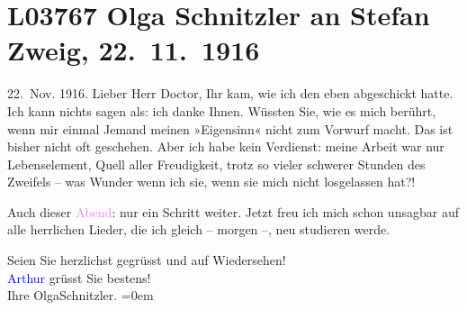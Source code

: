 

\section[Olga Schnitzler an Stefan Zweig, 22. 11. 1916]{L03767 Olga Schnitzler an Stefan Zweig, 22. 11. 1916}
\nopagebreak{}
\rehead{ }\normalsize\beginnumbering{}
\toendnotes[C]{\smallbreak\pagebreak[2]}
\toendnotes[C]{\smallbreak}
\pstart
           \raggedleft{}{\pb}22. Nov. 1916. \pend
           \vspace{0.5em}
\pstart
           Lieber Herr Doctor, Ihr \label{K_L03767-1v}\label{K_L03767-1} kam, wie ich den \label{K_L03767-2v}\label{K_L03767-2} eben
               abgeschickt hatte. Ich kann nichts sagen als: ich danke Ihnen. Wüssten Sie, wie es
               mich berührt, wenn mir einmal Jemand meinen »Eigensinn« nicht zum Vorwurf macht. Das
               ist bisher nicht oft geschehen. Aber ich habe {\pb}kein
               Verdienst: meine Arbeit war nur Lebenselement, Quell aller Freudigkeit, trotz so
               vieler schwerer Stunden des Zweifels – was Wunder wenn ich sie, wenn sie mich nicht
               losgelassen hat?!\pend
           
\pstart
           Auch dieser \textcolor{violet}{Abend}\ledrightnote{{$\rightarrow$}\emph{\textcolor{violet}{Gesangskonzert von Olga Schnitzler, 18.11.1916}}}: nur ein Schritt weiter. Jetzt freu ich mich schon unsagbar auf
               alle herrlichen Lieder, die ich gleich – morgen –, neu studieren werde.\pend
           
\pstart
           Seien Sie herzlichst gegrüsst und auf Wiedersehen!{\\[\baselineskip]}\textcolor{blue}{Arthur}{}\ledrightnote{} grüsst Sie bestens!{\\[\baselineskip]}Ihre
                  \spacefill\mbox{OlgaSchnitzler.}\pend
           \leftskip=0em{}\endnumbering{}
\begin{anhang}
\end{anhang}
      